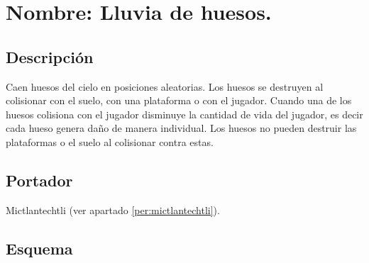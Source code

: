 \section{Nombre: Lluvia de huesos.}\label{hab.LluHuesos}
\subsection{Descripción}
Caen huesos del cielo en posiciones aleatorias. Los huesos se destruyen al colisionar con el suelo, con una plataforma o con el jugador. Cuando una de los huesos colisiona con el jugador disminuye la cantidad de vida del jugador, es decir cada hueso genera daño de manera individual. Los huesos no pueden destruir las plataformas o el suelo al colisionar contra estas.
\subsection{Portador}
Mictlantechtli (ver apartado \ref{per:mictlantechtli}).	
\subsection{Esquema}
			